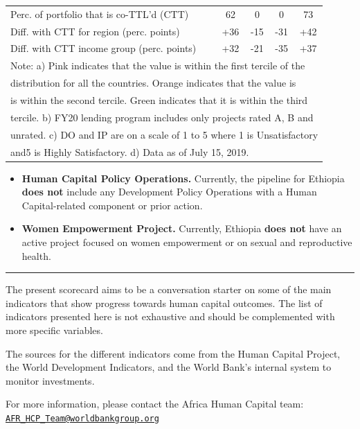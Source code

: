 \documentclass[9.2pt,twocolumn]{article}
\begin{document}
\begin{table}[H]
\begin{tabular}{lcccc}
Perc. of portfolio that is co-TTL'd (CTT)    &      \cellcolor{asparagus}  62                &    \cellcolor{blush}     0               &    \cellcolor{blush}    0           &   \cellcolor{asparagus} 73  \\
Diff. with CTT for region (perc. points)  &     +36                &      -15               &        -31          &    +42\\
Diff. with CTT income group (perc. points)  &     +32                &     -21               &       -35           &  +37\\
\hline
                         \multicolumn{5}{l}{Note: a) Pink indicates that the value is within the first tercile of the} \\
                         \multicolumn{5}{l}{distribution for all the countries. Orange indicates that the value is } \\
                         \multicolumn{5}{l}{is within the second tercile. Green indicates that it is within the third} \\
                         \multicolumn{5}{l}{tercile. b) FY20 lending program includes only projects rated A, B and } \\
                          \multicolumn{5}{l}{unrated. c) DO and IP are on a scale of 1 to 5 where 1 is Unsatisfactory } \\
                          \multicolumn{5}{l}{and5 is Highly Satisfactory. d) Data as of July 15, 2019.} \\
\end{tabular}
\end{table}

\begin{itemize}
\item
  \textbf{Human Capital Policy Operations.} Currently, the pipeline for
  Ethiopia \textbf{does not} include any Development Policy Operations
  with a Human Capital-related component or prior action.
\item
  \textbf{Women Empowerment Project.} Currently, Ethiopia \textbf{does
  not} have an active project focused on women empowerment or on sexual
  and reproductive health.
\end{itemize}

\noindent

\rule{9cm}{0.4pt}

The present scorecard aims to be a conversation starter on some of the
main indicators that show progress towards human capital outcomes. The
list of indicators presented here is not exhaustive and should be
complemented with more specific variables. ~

The sources for the different indicators come from the Human Capital
Project, the World Development Indicators, and the World Bank's internal
system to monitor investments. ~

For more information, please contact the Africa Human Capital team:
\href{mailto:AFR_HCP_Team@worldbankgroup.org}{\nolinkurl{AFR\_HCP\_Team@worldbankgroup.org}}
\end{document}
